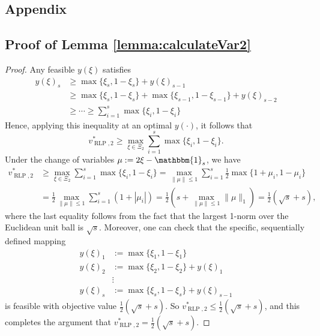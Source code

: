 \documentclass[12pt]{article}
\DeclareMathOperator{\AR}{RLP}
\begin{document}




\begin{onehalfspace}

\section{Appendix}

\subsection{Proof of Lemma \ref{lemma:calculateVar2}}

\begin{proof}
Any feasible $y(\xi)$ satisfies
\begin{align*}
    y(\xi)_s
    &\ge \max\{\xi_s, 1 - \xi_s\} + y(\xi)_{s-1} \\
    &\ge \max\{\xi_s, 1 - \xi_s\} + \max\{\xi_{s-1}, 1 - \xi_{s-1}\} + y(\xi)_{s-2} \\
    &\ge \cdots \ge \sum_{i=1}^s \max\{\xi_i, 1 - \xi_i\}
\end{align*}
Hence, applying this inequality at an optimal $y(\cdot)$, it follows
that
\[
v_{\AR,2}^*
\ge \max \limits_{\xi \in \Xi_2} \sum_{i=1}^s \max\{\xi_i, 1 - \xi_i\}.
\]
Under the change of variables $\mu := 2 \xi - \mathbbm{1}_s$, we have 
\begin{align*}
v_{\AR,2}^*
&\ge
\max \limits_{\xi \in \Xi_2} \sum_{i=1}^s \max\{\xi_i, 1 - \xi_i\}
=
\max \limits_{\|\mu\| \le 1} \sum_{i=1}^s \tfrac12 \max\{1 + \mu_i, 1 - \mu_i\} \\
&=
\frac12 \max \limits_{\|\mu\| \le 1} \sum_{i=1}^s (1 + |\mu_i|)
=
\frac12 \left(s + \max \limits_{\|\mu\| \le 1} \|\mu\|_1 \right)
=
\tfrac12 (\sqrt{s} + s),
\end{align*}
where the last equality follows from the fact that the largest 1-norm
over the Euclidean unit ball is $\sqrt{s}$. Moreover, one can check that
the specific, sequentially defined mapping 
\begin{align*}  
y(\xi)_1 &:= \max\{\xi_1, 1 - \xi_1\} \\
y(\xi)_2 &:= \max\{\xi_2, 1 - \xi_2\} + y(\xi)_1 \\
&\vdots \\
y(\xi)_s &:= \max\{\xi_s, 1 - \xi_s\} + y(\xi)_{s-1}
\end{align*}
is feasible with objective value $\tfrac12(\sqrt{s} + s)$. So $v_{\AR,
2}^* \le \tfrac12(\sqrt{s} + s)$, and this completes the argument that
$v_{\AR, 2}^* = \tfrac12(\sqrt{s} + s)$.
\end{proof}


\end{onehalfspace}
\end{document}
